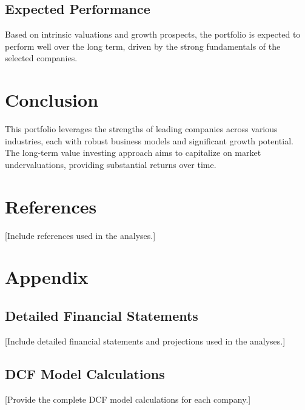 \documentclass[12pt]{report}
\begin{document}
\section{Expected Performance}
Based on intrinsic valuations and growth prospects, the portfolio is expected to perform well over the long term, driven by the strong fundamentals of the selected companies.

\chapter{Conclusion}
This portfolio leverages the strengths of leading companies across various industries, each with robust business models and significant growth potential. The long-term value investing approach aims to capitalize on market undervaluations, providing substantial returns over time.

\chapter{References}
[Include references used in the analyses.]

\appendix
\chapter{Appendix}
\section{Detailed Financial Statements}
[Include detailed financial statements and projections used in the analyses.]

\section{DCF Model Calculations}
[Provide the complete DCF model calculations for each company.]
\end{document}
